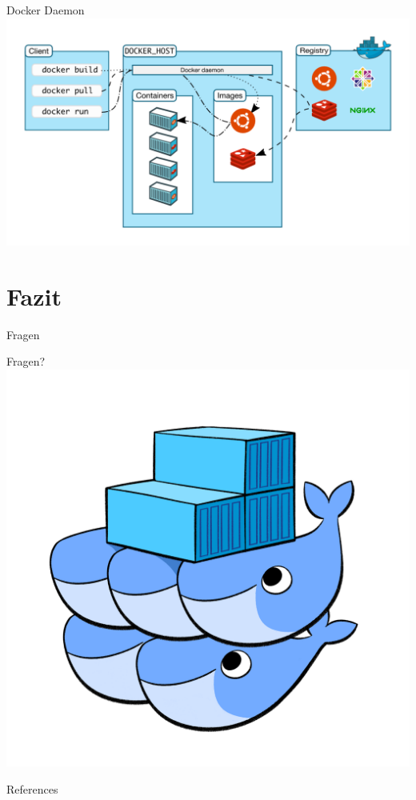\documentclass[10pt]{beamer}
\begin{document}
\begin{frame}{Docker Daemon}
  \includegraphics[width=1\textwidth]{../images/12-docker-daemon.png}
\end{frame}

\section{Fazit}

\begin{frame}{Fragen}

  Fragen?
  \includegraphics[width=1\textwidth]{../images/14-docker-swarm-hero2.png}

\end{frame}

\appendix

\begin{frame}[allowframebreaks]{References}

  \printbibliography

\end{frame}
\end{document}

